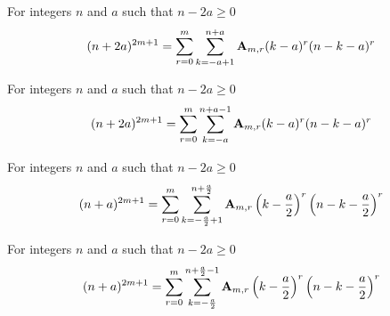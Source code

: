 \begin{corollary}
    \label{prop:odd-power-binomial-plus}
    For integers $n$ and $a$ such that $n-2a \geq 0$
    \begin{align*}
    (n+2a)^{2m+1} = \sum_{r=0}^{m} \sum_{k=-a+1}^{n+a} {\mathbf{A}} \sb{m,r} (k-a)^r (n-k-a)^r
    \end{align*}
\end{corollary}

\begin{corollary}
    \label{prop:odd-power-binomial-plus-shifted}
    For integers $n$ and $a$ such that $n-2a \geq 0$
    \begin{align*}
    (n+2a)^{2m+1} = \sum_{r=0}^{m} \sum_{k=-a}^{n+a-1} {\mathbf{A}} \sb{m,r} (k-a)^r (n-k-a)^r
    \end{align*}
\end{corollary}

\begin{corollary}
    \label{cor:odd-power-binomial-centered}
    For integers $n$ and $a$ such that $n-2a \geq 0$
    \begin{align*}
    (n+a)^{2m+1} = \sum_{r=0}^{m} \sum_{k=-\frac{a}{2}+1}^{n+\frac{a}{2}} {\mathbf{A}} \sb{m,r} \left( k-\frac{a}{2} \right)^r \left( n-k-\frac{a}{2} \right)^r
    \end{align*}
\end{corollary}

\begin{corollary}
    \label{cor:odd-power-binomial-centered-shifted}
    For integers $n$ and $a$ such that $n-2a \geq 0$
    \begin{align*}
    (n+a)^{2m+1} = \sum_{r=0}^{m} \sum_{k=-\frac{a}{2}}^{n+\frac{a}{2}-1} {\mathbf{A}} \sb{m,r} \left( k-\frac{a}{2} \right)^r \left( n-k-\frac{a}{2} \right)^r
    \end{align*}
\end{corollary}
